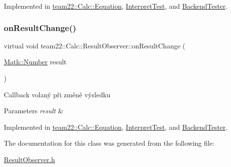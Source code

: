 Implemented in \hyperlink{classteam22_1_1_calc_1_1_equation_a4e7a0614867931bcc714440441cdd894}{team22\+::\+Calc\+::\+Equation}, \hyperlink{struct_interpret_test_a8dd2550d1b3e604db0230c2a3f4807a5}{Interpret\+Test}, and \hyperlink{class_backend_tester_a9f83f432f7d71304026ff07caf20a65d}{Backend\+Tester}.

\mbox{\label{classteam22_1_1_calc_1_1_result_observer_aa04007df3aa8a499c3a511f549238285}} 
\subsubsection{\texorpdfstring{on\+Result\+Change()}{onResultChange()}}
{\footnotesize\ttfamily virtual void team22\+::\+Calc\+::\+Result\+Observer\+::on\+Result\+Change (\begin{DoxyParamCaption}\item[{\hyperlink{classteam22_1_1_math_1_1_number}{Math\+::\+Number}}]{result }\end{DoxyParamCaption})\hspace{0.3cm}{\ttfamily [pure virtual]}}

Callback volaný při změně výsledku 
\begin{DoxyParams}{Parameters}
{\em result} & \\
\hline
\end{DoxyParams}


Implemented in \hyperlink{classteam22_1_1_calc_1_1_equation_a302c295e099f589897a1bad4b02d3de8}{team22\+::\+Calc\+::\+Equation}, \hyperlink{struct_interpret_test_af3c7dfecc5779919bf629c558c696548}{Interpret\+Test}, and \hyperlink{class_backend_tester_af84da1816cef621e57c65a01aa26d66e}{Backend\+Tester}.



The documentation for this class was generated from the following file\+:\begin{DoxyCompactItemize}
\item 
\hyperlink{_result_observer_8h}{Result\+Observer.\+h}\end{DoxyCompactItemize}

